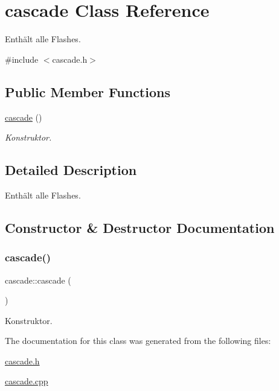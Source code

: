 \hypertarget{classcascade}{}\section{cascade Class Reference}
\label{classcascade}


Enthält alle Flashes.  




{\ttfamily \#include $<$cascade.\+h$>$}

\subsection*{Public Member Functions}
\begin{DoxyCompactItemize}
\item 
\mbox{\hyperlink{classcascade_a0215d853ce25d724cd778ab512b0eda6}{cascade}} ()
\begin{DoxyCompactList}\small\item\em Konstruktor. \end{DoxyCompactList}\end{DoxyCompactItemize}


\subsection{Detailed Description}
Enthält alle Flashes. 

\subsection{Constructor \& Destructor Documentation}
\mbox{\label{classcascade_a0215d853ce25d724cd778ab512b0eda6}} 
\subsubsection{\texorpdfstring{cascade()}{cascade()}}
{\footnotesize\ttfamily cascade\+::cascade (\begin{DoxyParamCaption}{ }\end{DoxyParamCaption})}



Konstruktor. 



The documentation for this class was generated from the following files\+:\begin{DoxyCompactItemize}
\item 
\mbox{\hyperlink{cascade_8h}{cascade.\+h}}\item 
\mbox{\hyperlink{cascade_8cpp}{cascade.\+cpp}}\end{DoxyCompactItemize}
